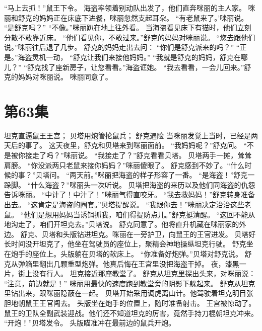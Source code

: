 \documentclass[a4paper,12pt,UTF8,twoside]{ctexbook}
\begin{document}
        “马上去抓！”鼠王下令。 
        海盗率领着别动队出发了，他们直奔咪丽的主人家。 
        咪丽和舒克的妈妈正在床底下进餐，咪丽忽然支起耳朵。 
        “有老鼠来了。’咪丽说。 
        “是舒克吗？” 
        “不像。”咪丽趴在地上往外看。 
        当海盗看见床下有猫时，他们立刻分散不敢靠近床。 
        “他们看见你，不敢过来。”舒克的妈妈对咪丽说。 
        “您去跟他们说。”咪丽往后退了几步。 
        舒克的妈妈走出去问：  “你们是舒克派来的吗？” 
        “正是。”海盗灵机一动，  “舒克让我们来接他妈妈。” 
        “我就是舒克的妈妈，舒克在哪儿？” 
        “舒克找了座新房子，让您看看。”海盗诓她。 
        “我去看看，一会儿回来。”舒克的妈妈对咪丽说。 
        咪丽同意了。   \chapter{第63集} 
        坦克直逼鼠王王宫； 
        贝塔用炮管抡鼠兵； 
        舒克遇险   
        当咪丽发觉上当时，已经是两天后的事了。 
        这天夜里，舒克和贝塔来到咪丽面前。 
        “我妈妈呢？”舒克问。 
        “不是被你接走了吗？”咪丽说。 
        “我接走了？”舒克看看贝塔。 
        贝塔两手一摊，耸耸肩膀。 
        “你没派两只老鼠来接你妈妈？”咪丽傻眼了。 
        舒克感到不妙了。“什么时候的事？”贝塔问。 
        “两天前。”咪丽把海盗的样子形容了一番。 
        “是海盗！”舒克一跺脚。 
        “什么海盗？”咪丽头一次听说。 
        贝塔把海盗的来历以及他们同海盗的仇怨告诉咪丽。 
        “中计了！中汁了！”咪丽气得直咬牙。 
        “我去救妈妈！”舒克转身准备出去。 
        “这肯定是海盗的圈套。”贝塔提醒说。 
        “我跟你去！”咪丽决定治治这些老鼠。 
        “他们是想用妈妈当诱饵抓我，咱们得提防点儿。”舒克挺清醒。 
        “这回不能从地沟走了，咱们开坦克去。”贝塔说。 
        舒克同意了。他将直升机藏在咪丽家的外边。 
        舒克、贝塔和头版钻进坦克。咪丽在一旁护卫，向鼠王的王官进发。 
        贝塔好长时间没开坦克了，他坐在驾驶员的座位上，聚精会神地操纵坦克行驶。 
        舒克坐在炮手的座位上。头版躺在贝塔的软床上。 
        “你准备好炮弹。”贝塔对舒克说。 
        舒克从弹箱里翻出几颗重型炮弹。他真后悔在王宫里没把海盗干掉。 
        夜，漆黑一片，街上没有行人。 
        坦克接近那座教堂了。 
        舒克从坦克里探出头来，对咪丽说： 
        “注意，前边就是！” 
        咪丽用最快的速度跑到教堂旁的阴影下躲起来。 
        舒克从坦克里钻出来，跟咪丽隐蔽在一起。 
        贝塔开始采用调虎离山计。他驾驶着坦克明目张胆地朝鼠王王官闯去。 
        头版坐在炮手的位置上，随时准备射击。 
        王宫被惊动了。 
        鼠王的卫队全副武装迎战。他们还不知道坦克的厉害，竟然手持刀棍朝坦克冲来。 
        “开炮！”贝塔发令。 
        头版瞄准冲在最前边的鼠兵开炮。 
\end{document}

